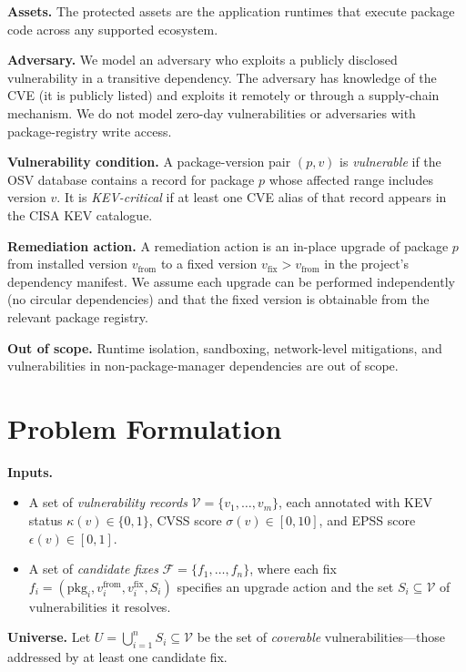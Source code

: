 \documentclass[conference]{IEEEtran}
\begin{document}
\textbf{Assets.}  The protected assets are the application runtimes
that execute package code across any supported ecosystem.

\textbf{Adversary.}  We model an adversary who exploits a publicly
disclosed vulnerability in a transitive dependency.  The adversary
has knowledge of the CVE (it is publicly listed) and exploits it
remotely or through a supply-chain mechanism.  We do not model
zero-day vulnerabilities or adversaries with package-registry write
access.

\textbf{Vulnerability condition.}  A package-version pair $(p, v)$ is
\emph{vulnerable} if the OSV database contains a record for package $p$
whose affected range includes version $v$.  It is \emph{KEV-critical}
if at least one CVE alias of that record appears in the CISA KEV
catalogue.

\textbf{Remediation action.}  A remediation action is an in-place
upgrade of package $p$ from installed version $v_{\text{from}}$ to a
fixed version $v_{\text{fix}} > v_{\text{from}}$ in the project's
dependency manifest.  We assume each upgrade can be performed
independently (no circular dependencies) and that the fixed version is
obtainable from the relevant package registry.

\textbf{Out of scope.}  Runtime isolation, sandboxing, network-level
mitigations, and vulnerabilities in non-package-manager dependencies
are out of scope.

\section{Problem Formulation}
\label{sec:problem}

\textbf{Inputs.}
\begin{itemize}
  \item A set of \emph{vulnerability records}
        $\mathcal{V} = \{v_1, \ldots, v_m\}$, each annotated with
        KEV status $\kappa(v) \in \{0,1\}$, CVSS score
        $\sigma(v) \in [0,10]$, and EPSS score $\epsilon(v) \in [0,1]$.
  \item A set of \emph{candidate fixes}
        $\mathcal{F} = \{f_1, \ldots, f_n\}$, where each fix
        $f_i = (\text{pkg}_i, v^{\text{from}}_i, v^{\text{fix}}_i,
        S_i)$ specifies an upgrade action and the set
        $S_i \subseteq \mathcal{V}$ of vulnerabilities it resolves.
\end{itemize}

\textbf{Universe.}  Let
$U = \bigcup_{i=1}^{n} S_i \subseteq \mathcal{V}$ be the set of
\emph{coverable} vulnerabilities---those addressed by at least one
candidate fix.
\end{document}
